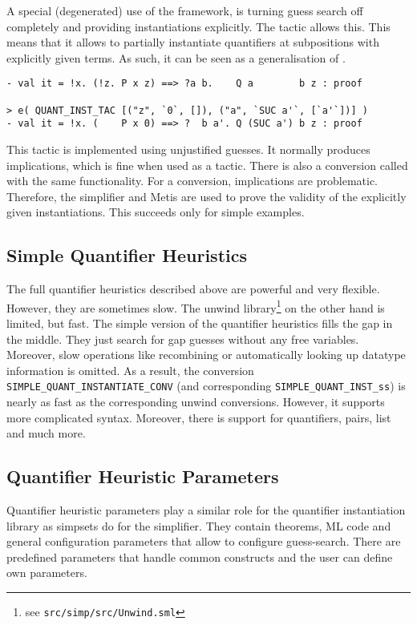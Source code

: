 A special (degenerated) use of the framework, is turning guess search off completely and
providing instantiations explicitly. The tactic  allows this. This means that
it allows to partially instantiate quantifiers at subpositions
with explicitly given terms. As such, it can be seen as
a generalisation of .
%
\begin{session}
\begin{verbatim}
- val it = !x. (!z. P x z) ==> ?a b.    Q a        b z : proof

> e( QUANT_INST_TAC [("z", `0`, []), ("a", `SUC a'`, [`a'`])] )
- val it = !x. (    P x 0) ==> ?  b a'. Q (SUC a') b z : proof
\end{verbatim}
\end{session}
%
This tactic is implemented using unjustified guesses. It normally
produces implications, which is fine when used as a tactic. There is
also a conversion called  with the same
functionality. For a conversion, implications are
problematic. Therefore, the simplifier and Metis are used to prove
the validity of the explicitly given instantiations. This succeeds
only for simple examples.

\subsection{Simple Quantifier Heuristics}

The full quantifier heuristics described above are powerful and very flexible.
However, they are sometimes slow.
The unwind library\footnote{see \texttt{src/simp/src/Unwind.sml}} on the other hand is limited, but fast.
The simple version of the quantifier heuristics fills the gap in the middle.
They just search for gap guesses without any free variables.
Moreover, slow operations like recombining or automatically looking up datatype information is omitted.
As a result, the conversion \texttt{SIMPLE\_QUANT\_INSTANTIATE\_CONV} (and corresponding \texttt{SIMPLE\_QUANT\_INST\_ss}) is nearly as fast as the corresponding unwind conversions.
However, it supports more complicated syntax. Moreover, there is support for quantifiers, pairs, list and much more. 

\subsection{Quantifier Heuristic Parameters}\label{quantHeu-subsec-qps}

Quantifier heuristic parameters play a similar role for the quantifier
instantiation library as simpsets do for the simplifier. They contain
theorems, ML code and general configuration parameters that allow to configure
guess-search. There are predefined parameters that handle
common constructs and the user can define own parameters.

